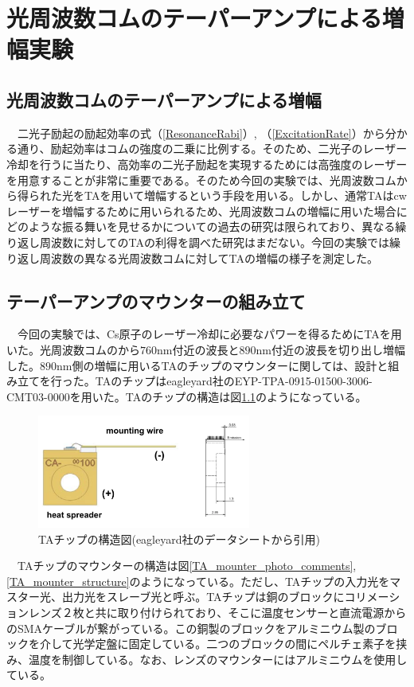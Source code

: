 \documentclass[uplatex, dvipdfmx, a4paper, report, papersize, 11pt]{jsbook}
\begin{document}
\newpage
\chapter{光周波数コムのテーパーアンプによる増幅実験}
\section{光周波数コムのテーパーアンプによる増幅}
　二光子励起の励起効率の式（\ref{ResonanceRabi}）, （\ref{ExcitationRate}）から分かる通り、励起効率はコムの強度の二乗に比例する。そのため、二光子のレーザー冷却を行うに当たり、高効率の二光子励起を実現するためには高強度のレーザーを用意することが非常に重要である。そのため今回の実験では、光周波数コムから得られた光をTAを用いて増幅するという手段を用いる。しかし、通常TAはcwレーザーを増幅するために用いられるため、光周波数コムの増幅に用いた場合にどのような振る舞いを見せるかについての過去の研究は限られており、異なる繰り返し周波数に対してのTAの利得を調べた研究はまだない。今回の実験では繰り返し周波数の異なる光周波数コムに対してTAの増幅の様子を測定した。

\newpage
\section{テーパーアンプのマウンターの組み立て}
　今回の実験では、Cs原子のレーザー冷却に必要なパワーを得るためにTAを用いた。光周波数コムのから$760 \mathrm{nm}$付近の波長と$890 \mathrm{nm}$付近の波長を切り出し増幅した。$890 \mathrm{nm}$側の増幅に用いるTAのチップのマウンターに関しては、設計と組み立てを行った。TAのチップはeagleyard社のEYP-TPA-0915-01500-3006-CMT03-0000を用いた。TAのチップの構造は図\ref{TA_chip_ds}のようになっている。\\
\begin{figure}[htbp]
 \begin{center}
  \includegraphics[width=70mm]{figures/chapter4/TA_chip_ds.png}
\end{center}
 \caption{TAチップの構造図(eagleyard社のデータシートから引用)}
 \label{TA_chip_ds}
\end{figure}
　TAチップのマウンターの構造は図\ref{TA_mounter_photo_comments},\ref{TA_mounter_structure}のようになっている。ただし、TAチップの入力光をマスター光、出力光をスレーブ光と呼ぶ。TAチップは銅のブロックにコリメーションレンズ２枚と共に取り付けられており、そこに温度センサーと直流電源からのSMAケーブルが繋がっている。この銅製のブロックをアルミニウム製のブロックを介して光学定盤に固定している。二つのブロックの間にペルチェ素子を挟み、温度を制御している。なお、レンズのマウンターにはアルミニウムを使用している。
\end{document}
